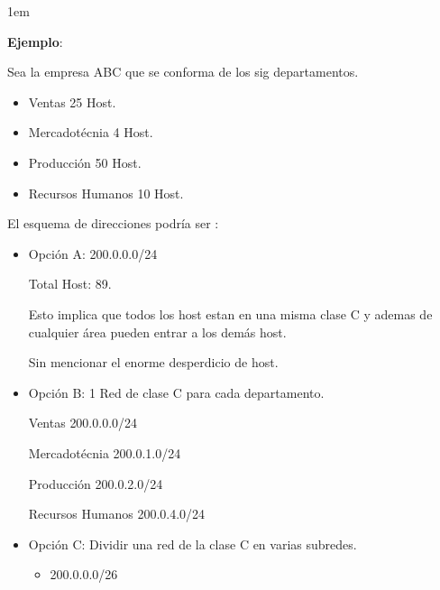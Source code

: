 \documentclass[12pt, fleqn]{report}                             %
\newenvironment{SmallIndentation}[1][0.75em]                    %
        {\begin{adjustwidth}{#1}{}\begin{footnotesize}}             %
        {\end{footnotesize}\end{adjustwidth}}                       %
\theoremstyle{break}                                            %
\newcommand{\Color}[2]{\textcolor{#1}{#2}}                      %
\begin{document}
            \begin{SmallIndentation}[1em]
                \textbf{Ejemplo}:
                
                Sea la empresa ABC que se conforma de los sig departamentos.

                \begin{itemize}
                    \item Ventas 25 Host.
                    \item Mercadotécnia 4 Host.
                    \item Producción 50 Host.
                    \item Recursos Humanos 10 Host.
                \end{itemize}

                El esquema de direcciones podría ser :

                \begin{itemize}
                    \item 
                        Opción A: \Color{Blue700MD}{200.0.0.0/24}

                        Total Host: 89.

                        Esto implica que todos los host estan en una misma clase
                        C y ademas de cualquier área pueden entrar a los demás host.

                        Sin mencionar el enorme desperdicio de host.

                    \item 
                        Opción B: 1 Red de clase C para cada departamento.

                        Ventas \Color{Blue700MD}{200.0.0.0/24}

                        Mercadotécnia \Color{Blue700MD}{200.0.1.0/24}

                        Producción \Color{Blue700MD}{200.0.2.0/24}

                        Recursos Humanos \Color{Blue700MD}{200.0.4.0/24}

                    \item 
                        Opción C: Dividir una red de la clase C en varias subredes.

                        \begin{itemize}
                            \item \Color{Blue700MD}{200.0.0.0/26}
                        \end{itemize}

                \end{itemize}

            
            \end{SmallIndentation}
                
\end{document}
